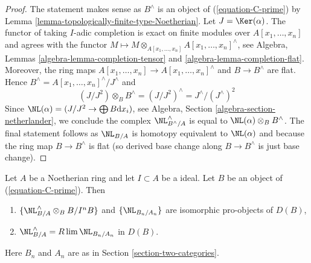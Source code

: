 \begin{proof}
The statement makes sense as $B^\wedge$ is an object of
(\ref{equation-C-prime}) by
Lemma \ref{lemma-topologically-finite-type-Noetherian}.
Let $J = \Ker(\alpha)$. The functor of taking
$I$-adic completion is exact on finite modules over
$A[x_1, \ldots, x_n]$ and agrees with the functor
$M \mapsto M \otimes_{A[x_1, \ldots, x_n]} A[x_1, \ldots, x_n]^\wedge$, see
Algebra, Lemmas \ref{algebra-lemma-completion-tensor} and
\ref{algebra-lemma-completion-flat}. Moreover, the ring maps
$A[x_1, \ldots, x_n] \to A[x_1, \ldots, x_n]^\wedge$
and $B \to B^\wedge$ are flat. Hence
$B^\wedge = A[x_1, \ldots, x_n]^\wedge / J^\wedge$ and
$$
(J/J^2) \otimes_B B^\wedge = (J/J^2)^\wedge = J^\wedge/(J^\wedge)^2
$$
Since $\NL(\alpha) = (J/J^2 \to \bigoplus B\text{d}x_i)$,
see Algebra, Section \ref{algebra-section-netherlander},
we conclude the complex $\NL_{B^\wedge/A}^\wedge$ is equal
to $\NL(\alpha) \otimes_B B^\wedge$. The final statement
follows as $\NL_{B/A}$ is homotopy equivalent to $\NL(\alpha)$
and because the ring map $B \to B^\wedge$ is flat (so derived
base change along $B \to B^\wedge$ is just base change).
\end{proof}

\begin{lemma}
\label{lemma-NL-is-limit}
Let $A$ be a Noetherian ring and let $I \subset A$ be a ideal.
Let $B$ be an object of (\ref{equation-C-prime}). Then
\begin{enumerate}
\item $\{\NL_{B/A}^\wedge \otimes_B B/I^nB\}$
and $\{\NL_{B_n/A_n}\}$ are isomorphic pro-objects of $D(B)$,
\item $\NL_{B/A}^\wedge = R\lim \NL_{B_n/A_n}$ in $D(B)$.
\end{enumerate}
Here $B_n$ and $A_n$ are as in Section \ref{section-two-categories}.
\end{lemma}

